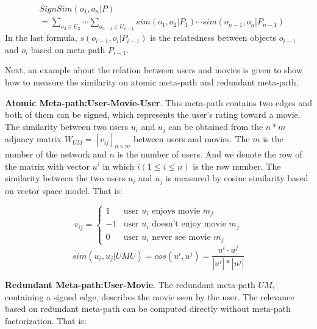 \documentclass{acm_proc_article-csis8101}
\begin{document}
\begin{equation}
\begin{split}
& SignSim(o_{1}, o_{n}|P)\\
& = \sum\limits_{o_{2} \in U_{2}} \cdots \sum\limits_{o_{n-1} \in U_{n-1}} sim(o_{1}, o_{2}|P_{1}) \cdots sim(o_{n-1}, o_{n}|P_{n-1})
\end{split}
\end{equation}
In the last formula, $s(o_{i-1}, o_{i}|P_{i-1})$ is the relatedness between objects $o_{i-1}$ and $o_{i}$ based on meta-path $P_{i-1}$.

Next, an example about the relation between users and movies is given to show how to measure the similarity on atomic meta-path and redundant meta-path.

\textbf{Atomic Meta-path:User-Movie-User}. This meta-path contains two edges and both of them can be signed, which represents the user's rating toward a movie. The similarity between two users $u_{i}$ and $u_{j}$ can be obtained from the $n*m$ adjancy matrix $W_{UM} = [v_{ij}]_{n \times m}$ between users and movies. The $m$ is the number of the network and $n$ is the number of users. And we denote the row of the matrix with vector $u^{i}$  in which $i(1 \leq i \leq n)$ is the row number. The similarity between the two users $u_{i}$ and $u_{j}$ is measured by cosine similarity based on vector space model. That is:

\begin{equation}
v_{ij}=
\begin{cases}
1& \text{user } u_{i} \text{ enjoys movie } m_{j}\\
-1& \text{user } u_{i} \text{ doesn't enjoy movie } m_{j}\\
0& \text{user } u_{i} \text{ never see movie } m_{j}
\end{cases}
\end{equation} 
\begin{equation}
sim(u_{i},u_{j}|UMU)=cos(u^{i},u^{j})=\frac{u^{i} \cdot u^{j}}{|u^{i}|*|u^{j}|}
\end{equation}

\textbf{Redundant Meta-path:User-Movie}. The redundant meta-path $UM$, containing a signed edge, describes the movie seen by the user. The relevance based on redundant meta-path can be computed directly without meta-path factorization. That is:
\end{document}
